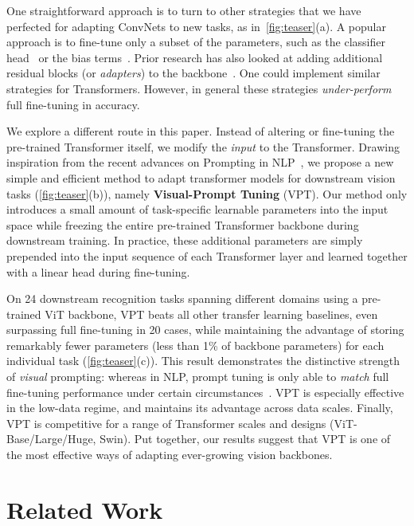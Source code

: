 One straightforward approach is to turn to other strategies that we have perfected for adapting ConvNets to new tasks, as in~\ref{fig:teaser}(a).
A popular approach is to fine-tune only a subset of the parameters, such as the classifier head~\cite{wslimageseccv2018,jia2021exploring,chen2021mocov3} or the bias terms~\cite{cai2020tinytl}. Prior research has also looked at adding additional residual blocks  (or \emph{adapters}) to the backbone~\cite{rebuffi2018efficient,zhang2020side}. One could implement similar strategies for Transformers. However, in general these strategies \emph{under-perform} full fine-tuning in accuracy.

We explore a different route in this paper. Instead of altering or fine-tuning the pre-trained Transformer itself, we modify the \emph{input} to the Transformer. Drawing inspiration from the recent advances on Prompting in NLP~\cite{liu2021pre,li-liang-2021-prefix,lester-etal-2021-power,liu2021p}, we propose a new simple and efficient method to adapt transformer models for downstream vision tasks (\ref{fig:teaser}(b)), namely \textbf{Visual-Prompt Tuning} (VPT). Our method only introduces a small amount of task-specific learnable parameters into the input space while freezing the entire pre-trained Transformer backbone during downstream training. In practice, these additional parameters are simply prepended into the input sequence of each Transformer layer and learned together with a linear head during fine-tuning.

On 24 downstream recognition tasks spanning different domains using a pre-trained ViT backbone, VPT beats all other transfer learning baselines, even surpassing full fine-tuning in 20 cases, while maintaining the advantage of storing remarkably fewer parameters (less than 1\% of backbone parameters) for each individual task (\ref{fig:teaser}(c)). 
This result demonstrates the distinctive strength of \emph{visual} prompting: whereas in NLP, prompt tuning is only able to \emph{match} full fine-tuning performance under certain circumstances~\cite{lester-etal-2021-power}. VPT is especially effective in the low-data regime, and maintains its advantage across data scales. Finally, VPT is competitive for a range of Transformer scales and designs (ViT-Base/Large/Huge, Swin). Put together, our results suggest that VPT is one of the most effective ways of adapting ever-growing vision backbones.

\section{Related Work}\label{sec:related}

